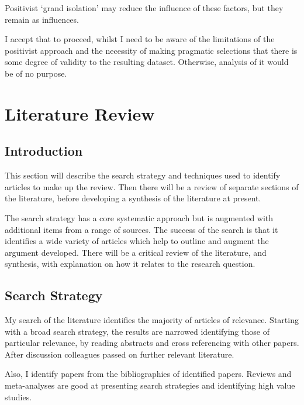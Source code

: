 \documentclass[
]{article}
\begin{document}
Positivist `grand isolation' may reduce the influence of these factors,
but they remain as influences.

I accept that to proceed, whilst I need to be aware of the limitations
of the positivist approach and the necessity of making pragmatic
selections that there is some degree of validity to the resulting
dataset. Otherwise, analysis of it would be of no purpose.

\newpage

\hypertarget{literature-review}{%
\section{Literature Review}\label{literature-review}}

\hypertarget{introduction-1}{%
\subsection{Introduction}\label{introduction-1}}

This section will describe the search strategy and techniques used to
identify articles to make up the review. Then there will be a review of
separate sections of the literature, before developing a synthesis of
the literature at present.

The search strategy has a core systematic approach but is augmented with
additional items from a range of sources. The success of the search is
that it identifies a wide variety of articles which help to outline and
augment the argument developed. There will be a critical review of the
literature, and synthesis, with explanation on how it relates to the
research question.

\hypertarget{search-strategy}{%
\subsection{Search Strategy}\label{search-strategy}}

My search of the literature identifies the majority of articles of
relevance. Starting with a broad search strategy, the results are
narrowed identifying those of particular relevance, by reading abstracts
and cross referencing with other papers. After discussion colleagues
passed on further relevant literature.

Also, I identify papers from the bibliographies of identified papers.
Reviews and meta-analyses are good at presenting search strategies and
identifying high value studies.
\end{document}

